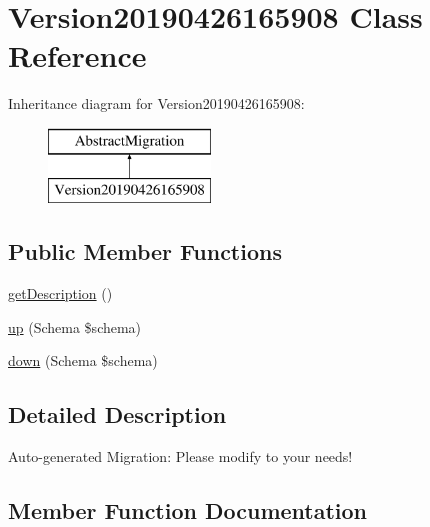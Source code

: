 \hypertarget{class_doctrine_migrations_1_1_version20190426165908}{}\section{Version20190426165908 Class Reference}
\label{class_doctrine_migrations_1_1_version20190426165908}
Inheritance diagram for Version20190426165908\+:\begin{figure}[H]
\begin{center}
\leavevmode
\includegraphics[height=2.000000cm]{class_doctrine_migrations_1_1_version20190426165908}
\end{center}
\end{figure}
\subsection*{Public Member Functions}
\begin{DoxyCompactItemize}
\item 
\mbox{\hyperlink{class_doctrine_migrations_1_1_version20190426165908_a2e7bb35c71bf1824456ceb944cb7a845}{get\+Description}} ()
\item 
\mbox{\hyperlink{class_doctrine_migrations_1_1_version20190426165908_a23eb1c1428e8ea2ab2cf798fc06ec421}{up}} (Schema \$schema)
\item 
\mbox{\hyperlink{class_doctrine_migrations_1_1_version20190426165908_aa8eb70255a46429d4d6165c778c9e5b9}{down}} (Schema \$schema)
\end{DoxyCompactItemize}


\subsection{Detailed Description}
Auto-\/generated Migration\+: Please modify to your needs! 

\subsection{Member Function Documentation}
\mbox{\label{class_doctrine_migrations_1_1_version20190426165908_aa8eb70255a46429d4d6165c778c9e5b9}} 
